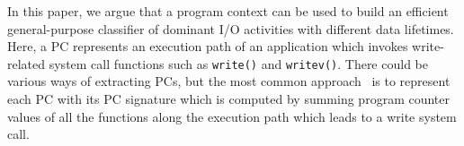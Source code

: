 In this paper, we argue that a program context can be
used to build an efficient general-purpose 
classifier of dominant I/O activities with different data lifetimes.
Here, a PC
represents an execution path of an application which invokes write-related
system call functions such as {\tt write()} and {\tt writev()}.  
There could be various ways of extracting PCs, 
but the most common approach~\cite{PC, PC2} is to
represent each PC with its PC signature which is computed by summing 
program counter values of all the functions along the execution path which
leads to a write system call.


\begin{figure}[!t]
\centering
	\hspace{2pt}
	\hspace{2pt}
	\hspace{2pt}
	\hfill

\end{figure}
